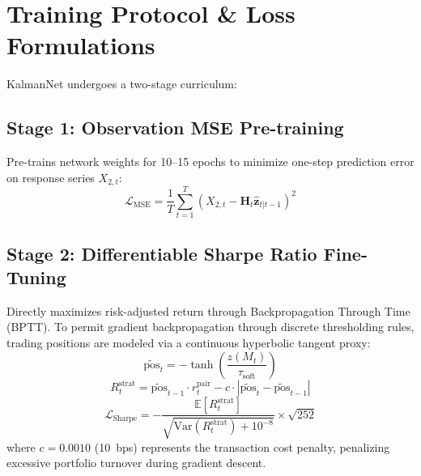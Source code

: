 \documentclass[11pt, a4paper]{article}
\begin{document}
\section{Training Protocol \& Loss Formulations}

KalmanNet undergoes a two-stage curriculum:

\subsection{Stage 1: Observation MSE Pre-training}
Pre-trains network weights for 10--15 epochs to minimize one-step prediction error on response series $X_{2,t}$:
\begin{equation}
    \mathcal{L}_{\text{MSE}} = \frac{1}{T} \sum_{t=1}^T \left( X_{2,t} - \mathbf{H}_t \hat{\mathbf{z}}_{t|t-1} \right)^2
\end{equation}

\subsection{Stage 2: Differentiable Sharpe Ratio Fine-Tuning}
Directly maximizes risk-adjusted return through Backpropagation Through Time (BPTT). To permit gradient backpropagation through discrete thresholding rules, trading positions are modeled via a continuous hyperbolic tangent proxy:
\begin{equation}
    \widetilde{\text{pos}}_t = -\tanh\left( \frac{z(M_t)}{\tau_{\text{soft}}} \right)
\end{equation}
\begin{equation}
    R_t^{\text{strat}} = \widetilde{\text{pos}}_{t-1} \cdot r_t^{\text{pair}} - c \cdot |\widetilde{\text{pos}}_t - \widetilde{\text{pos}}_{t-1}|
\end{equation}
\begin{equation}
    \mathcal{L}_{\text{Sharpe}} = - \frac{\mathbb{E}[R_t^{\text{strat}}]}{\sqrt{\text{Var}(R_t^{\text{strat}}) + 10^{-8}}} \times \sqrt{252}
\end{equation}
where $c = 0.0010$ (10~bps) represents the transaction cost penalty, penalizing excessive portfolio turnover during gradient descent.
\end{document}
